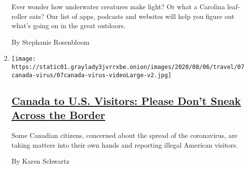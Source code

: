 \begin{enumerate}
  Ever wonder how underwater creatures make light? Or what a Carolina
  leaf-roller eats? Our list of apps, podcasts and websites will help
  you figure out what's going on in the great outdoors.

  By Stephanie Rosenbloom
\item
  \texttt{[image: https://static01.graylady3jvrrxbe.onion/images/2020/08/06/travel/07canada-virus/07canada-virus-videoLarge-v2.jpg]}

  \hypertarget{canada-to-us-visitors-please-dont-sneak-across-the-border}{%
  \subsection{\texorpdfstring{\href{/2020/08/07/travel/Canada-border-crossings-coronavirus.html}{Canada
  to U.S. Visitors: Please Don't Sneak Across the
  Border}}{Canada to U.S. Visitors: Please Don't Sneak Across the Border}}\label{canada-to-us-visitors-please-dont-sneak-across-the-border}}

  Some Canadian citizens, concerned about the spread of the coronavirus,
  are taking matters into their own hands and reporting illegal American
  visitors.

  By Karen Schwartz
\end{enumerate}

